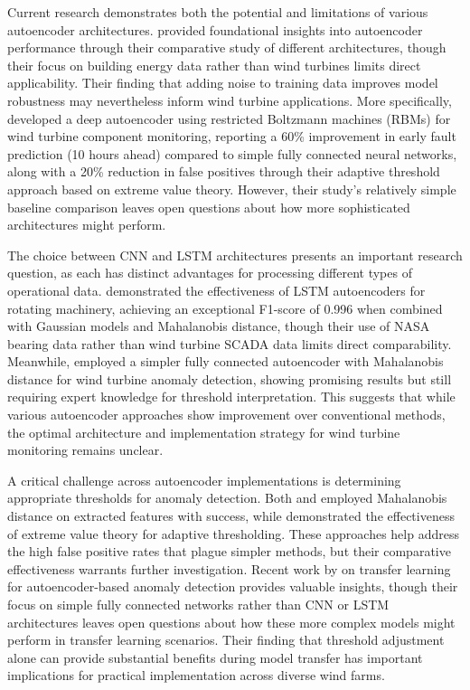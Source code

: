 \documentclass[a4paper,12pt]{article}
\begin{document}
Current research demonstrates both the potential and limitations of various autoencoder architectures. \citeauthor{fan_analytical_2018} provided foundational insights into autoencoder performance through their comparative study of different architectures, though their focus on building energy data rather than wind turbines limits direct applicability. Their finding that adding noise to training data improves model robustness may nevertheless inform wind turbine applications. More specifically, \citeauthor{zhao_anomaly_2018} developed a deep autoencoder using restricted Boltzmann machines (RBMs) for wind turbine component monitoring, reporting a 60\% improvement in early fault prediction (10 hours ahead) compared to simple fully connected neural networks, along with a 20\% reduction in false positives through their adaptive threshold approach based on extreme value theory. However, their study's relatively simple baseline comparison leaves open questions about how more sophisticated architectures might perform.

The choice between CNN and LSTM architectures presents an important research question, as each has distinct advantages for processing different types of operational data. \citeauthor{ahmad_autoencoder-based_2020} demonstrated the effectiveness of LSTM autoencoders for rotating machinery, achieving an exceptional F1-score of 0.996 when combined with Gaussian models and Mahalanobis distance, though their use of NASA bearing data rather than wind turbine SCADA data limits direct comparability. Meanwhile, \citeauthor{liu_wind_2022} employed a simpler fully connected autoencoder with Mahalanobis distance for wind turbine anomaly detection, showing promising results but still requiring expert knowledge for threshold interpretation. This suggests that while various autoencoder approaches show improvement over conventional methods, the optimal architecture and implementation strategy for wind turbine monitoring remains unclear.

A critical challenge across autoencoder implementations is determining appropriate thresholds for anomaly detection. Both \citeauthor{liu_wind_2022} and \citeauthor{ahmad_autoencoder-based_2020} employed Mahalanobis distance on extracted features with success, while \citeauthor{zhao_anomaly_2018} demonstrated the effectiveness of extreme value theory for adaptive thresholding. These approaches help address the high false positive rates that plague simpler methods, but their comparative effectiveness warrants further investigation. Recent work by \citeauthor{roelofs_transfer_2024} on transfer learning for autoencoder-based anomaly detection provides valuable insights, though their focus on simple fully connected networks rather than CNN or LSTM architectures leaves open questions about how these more complex models might perform in transfer learning scenarios. Their finding that threshold adjustment alone can provide substantial benefits during model transfer has important implications for practical implementation across diverse wind farms.
\end{document}
